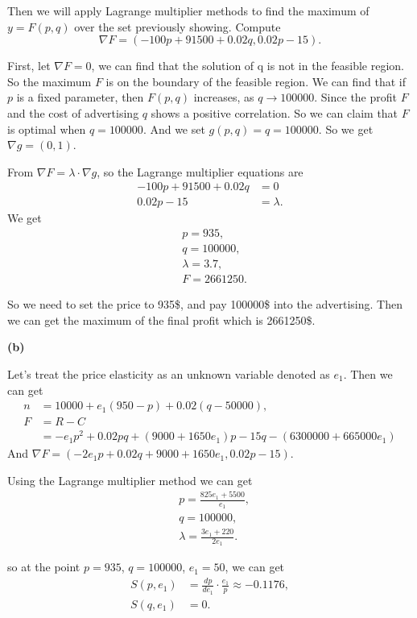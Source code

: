 \documentclass{report}
\begin{document}
\vspace{1em}
\hspace{-1.5em}{\bf Step 4. Solve the model}\par
Then we will apply Lagrange multiplier methods to find the maximum of $y=F(p,q)$ over 
the set previously showing. Compute 
\begin{equation*}
    \nabla F=(-100p+91500+0.02q, 0.02p-15).
\end{equation*}
\par First, let $\nabla F=0$, we can find that the solution of q is 
not in the feasible region. So the maximum $F$ is on the boundary of the feasible region. 
We can find that if $p$ is a fixed parameter, then $F(p, q)$ increases, as $q\longrightarrow 100000$. 
Since the profit $F$ and the cost of advertising $q$ shows a positive correlation. 
So we can claim that $F$ is optimal when $q = 100000$.  
And we set $g(p,q)=q=100000$. So we get $\nabla g=(0,1)$.
\par From $\nabla F = \lambda \cdot \nabla g$, so the Lagrange multiplier equations are 
\begin{align*}
    -100p+91500+0.02q&=0\\
    0.02p-15&=\lambda.
\end{align*} We get
\begin{align*}
&p = 935, \\
&q=100000, \\
&\lambda =3.7,\\
&F = 2661250.
\end{align*} 

\vspace{1em}
\hspace{-1.5em}{\bf Step 5. Answer the question}\par
So we need to set the price to 935\$, and pay 100000\$ into the advertising. 
Then we can get the maximum of the final profit which is 2661250\$.

\newpage
{\bf (b)}\par

Let's treat the price elasticity as an unknown variable denoted as $e_1$. Then we can get
\begin{align*}
    n&=10000+e_1(950-p)+0.02(q-50000),\\
    F&=R-C\\
    &=-e_1p^2 +0.02pq+(9000+1650e_1)p-15q-(6300000+665000e_1)   
\end{align*}
And $\nabla F =(-2e_1 p+0.02q+9000+1650e_1, 0.02p-15)$.
\par Using the Lagrange multiplier method we can get 
\begin{align*}
    &p=\frac{825e_1+5500}{e_1},\\
    &q=100000,\\
    &\lambda =\frac{3e_1+220}{2e_1}.
\end{align*}
\par so at the point $p = 935$, $q=100000$, $e_1=50$, we can get 
\begin{align*}
    S(p,e_1)&=\frac{dp}{de_1}\cdot \frac{e_1}{p}\approx -0.1176,\\
    S(q,e_1)&=0.
\end{align*}
\end{document}
